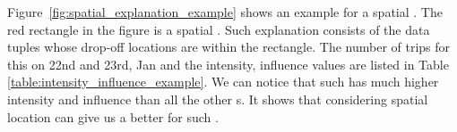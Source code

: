 Figure~\ref{fig:spatial_explanation_example} shows an example for a spatial {\explanation}. The red rectangle in the figure is a spatial {\explanation}. Such explanation consists of the data tuples whose drop-off locations are within the rectangle. The number of trips for this {\explanation} on 22nd and 23rd, Jan and the intensity, influence values are listed in Table \ref{table:intensity_influence_example}. We can notice that such {\explanation} has much higher intensity and influence than all the other {\explanation}s. It shows that considering spatial location can give us a better {\explanation} for such {\fact}. 







